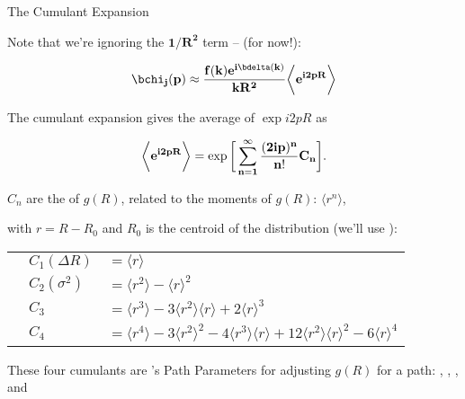 \begin{slide}{The Cumulant Expansion}
  \small
  \begin{cenpage}{98mm}\setlength{\baselineskip}{11pt}
    
    Note that we're ignoring the $\mathbf{1/R^2}$ term -- (for now!):

    \[  \displaystyle{\mathbf{
        \bchi_j(p)  
        \approx  {f(k)e^{i\bdelta(k)}\over{kR^2}} \biggl\langle e^{i2pR}  \biggr\rangle 
      }} 
    \]
    

    The cumulant expansion gives the average  of $\exp{i2pR}$ as

    \[ \displaystyle{\mathbf{
        \biggl\langle e^{i2pR} \biggr\rangle
        = \exp \bigg[ \sum_{n=1}^{\infty} { {(2ip)^n}\over{n!}}C_n  \bigg].}}
    \]
    
    \vmm $C_n$ are the {} of $g(R)$, related to the
    moments of $g(R)$: $\langle r^n \rangle$,

    with
    $r= R - R_0$ and $R_0$ is the centroid of the distribution (we'll use {}):
    
    \begin{tabular}{lll} 
      \hspace{4mm} & 
      $C_1 (\Delta R) $ & $ = \langle r \rangle    $ \\
      & $C_2 (\sigma^2) $ & $ = \langle r^2 \rangle - \langle r \rangle^2    $  \\
      & $ C_3 $ & $ = \langle r^3 \rangle - 3 \langle r^2 \rangle  
      \langle r \rangle  + 2 \langle r \rangle^3   $  \\
      & $ C_4 $ & $ =  \langle r^4 \rangle - 3 \langle r^2 \rangle^2 
      - 4\langle r^3 \rangle \langle r \rangle
      +12  \langle r^2 \rangle  \langle r \rangle^2 
      - 6\langle r \rangle^4  $   \\
    \end{tabular}

    \vmm
        
    These four cumulants are {\ifeffit}'s Path Parameters for adjusting
    $g(R)$ for a path: , , , and


    \vmm \begin{center}\end{center}
    

\vmm \vmm
    
\end{cenpage}
\vfill
\end{slide} 

